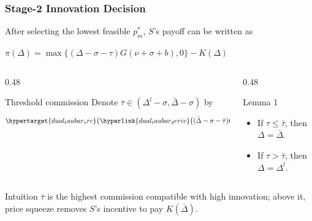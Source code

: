 \begin{frame}
  \frametitle{Stage-2 Innovation Decision}
  \footnotesize
  After selecting the lowest feasible $p_m^*$, $S$'s payoff can be written as
  \begin{center}
    \hypertarget{dual_s_profit_src}{%
      \hyperlink{dual_s_profit_deriv}{%
        $\displaystyle
        \pi(\Delta)=
        \max\{(\Delta-\sigma-\tau)G(\nu+\sigma+b),0\}-K(\Delta)$}}
  \end{center}

  \begin{columns}[T,onlytextwidth]
    \begin{column}{0.48\textwidth}
      \begin{block}{Threshold commission}
        Denote $\bar{\tau}\in(\Delta^l-\sigma,\bar{\Delta}-\sigma)$ by
        \[
          \hypertarget{dual_taubar_src}{%
            \hyperlink{dual_taubar_deriv}{%
              (\bar{\Delta}-\sigma-\bar{\tau})G(\nu+b+\sigma)
              -K(\bar{\Delta})=0.}}
        \]
      \end{block}
    \end{column}

    \begin{column}{0.48\textwidth}
      \begin{block}{Lemma 1}
        \begin{itemize}
          \item If $\tau\leq\bar{\tau}$, then
            $\Delta=\bar{\Delta}$.
          \item If $\tau>\bar{\tau}$, then
            $\Delta=\Delta^l$.
        \end{itemize}
      \end{block}
    \end{column}
  \end{columns}

  \begin{alertblock}{Intuition}
    $\bar{\tau}$ is the highest commission compatible with high innovation;
    above it, price squeeze removes $S$'s incentive to pay $K(\bar{\Delta})$.
  \end{alertblock}
\end{frame}

